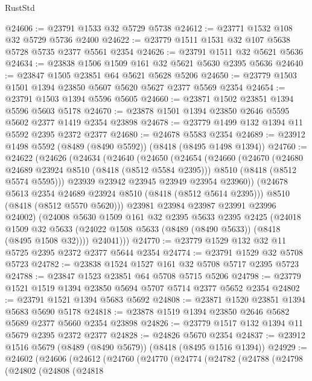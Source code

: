 \begin{lexlean}{RustStd}
\begin{coremodule}
@24606 := @23791 @1533 @32 @5729 @5738
@24612 := @23771 @1532 @108 @32 @5729 @5736 @2400
@24622 := @23779 @1511 @1531 @32 @107 @5638 @5728 @5735 @2377 @5561 @2354
@24626 := @23791 @1511 @32 @5621 @5636
@24634 := @23838 @1506 @1509 @161 @32 @5621 @5630 @2395 @5636
@24640 := @23847 @1505 @23851 @64 @5621 @5628 @5206
@24650 := @23779 @1503 @1501 @1394 @23850 @5607 @5620 @5627 @2377 @5569 @2354
@24654 := @23791 @1503 @1394 @5596 @5605
@24660 := @23871 @1502 @23851 @1394 @5596 @5603 @5178
@24670 := @23878 @1501 @1394 @23850 @2646 @5595 @5602 @2377 @1419 @2354 @23898
@24678 := @23779 @1499 @132 @1394 @11 @5592 @2395 @2372 @2377
@24680 := @24678 @5583 @2354
@24689 := @23912 @1498 @5592 (@8489 (@8490 @5592)) (@8418 (@8495 @1498 @1394))
@24760 := @24622
    (@24626
      (@24634
        (@24640
          (@24650
            (@24654
              (@24660
                (@24670
                  (@24680 @24689 @23924 @8510 (@8418 (@8512 @5584 @2395)))
                  @8510
                  (@8418 (@8512 @5574 @5595)))
                @23939
                @23942
                @23945
                @23949
                @23954
                @23960))
            (@24678 @5613 @2354 @24689 @23924 @8510 (@8418 (@8512 @5614 @2395)))
            @8510
            (@8418 (@8512 @5570 @5620)))
          @23981
          @23984
          @23987
          @23991
          @23996
          @24002)
        (@24008
          @5630
          @1509
          @161
          @32
          @2395
          @5633
          @2395
          @2425
          (@24018
            @1509
            @32
            @5633
            (@24022 @1508 @5633 (@8489 (@8490 @5633)) (@8418 (@8495 @1508 @32))))
          @24041)))
@24770 := @23779 @1529 @132 @32 @11 @5725 @2395 @2372 @2377 @5644 @2354
@24774 := @23791 @1529 @32 @5708 @5723
@24782 := @23838 @1524 @1527 @161 @32 @5708 @5717 @2395 @5723
@24788 := @23847 @1523 @23851 @64 @5708 @5715 @5206
@24798 := @23779 @1521 @1519 @1394 @23850 @5694 @5707 @5714 @2377 @5652 @2354
@24802 := @23791 @1521 @1394 @5683 @5692
@24808 := @23871 @1520 @23851 @1394 @5683 @5690 @5178
@24818 := @23878 @1519 @1394 @23850 @2646 @5682 @5689 @2377 @5660 @2354 @23898
@24826 := @23779 @1517 @132 @1394 @11 @5679 @2395 @2372 @2377
@24828 := @24826 @5670 @2354
@24837 := @23912 @1516 @5679 (@8489 (@8490 @5679)) (@8418 (@8495 @1516 @1394))
@24929 := @24602
    (@24606
      (@24612
        (@24760
          (@24770
            (@24774
              (@24782
                (@24788
                  (@24798
                    (@24802
                      (@24808
                        (@24818

\end{coremodule}
\end{lexlean}
